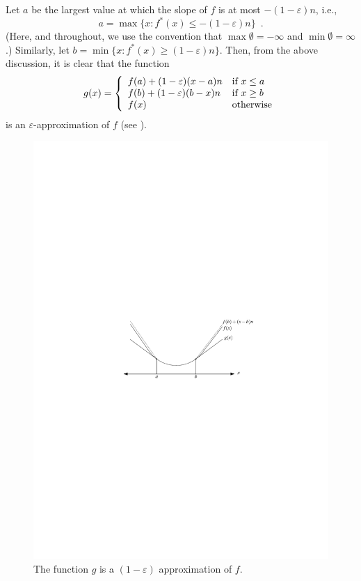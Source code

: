 \documentclass[charterfonts,lotsofwhite]{patmorin}
\newcommand{\eps}{\varepsilon}
\begin{document}
Let $a$ be the largest value at which the slope of $f$ is at most
$-(1-\eps)n$, i.e., 
\[
a=\max\{x:f^*(x)\le -(1-\eps)n \} \enspace .
\]
(Here, and throughout, we use the convention that
$\max\emptyset=-\infty$ and $\min\emptyset=\infty$.)  Similarly, let
$b=\min\{x:f^*(x)\ge (1-\eps) n\}$.  Then, from the above discussion,
it is clear that the function
\begin{equation}
 g(x) = \left\{\begin{array}{ll}
                 f(a) + (1-\eps)(x-a)n & \mbox{if $x\le a$} \\
                 f(b) + (1-\eps)(b-x)n & \mbox{if $x\ge b$} \\
                 f(x)   & \mbox{otherwise} \eqlabel{approx}
 \end{array}\right.
\end{equation}
is an $\eps$-approximation of $f$ (see ).

\begin{figure}
\begin{center}\includegraphics{approx}\end{center}
\caption{The function $g$ is a $(1-\eps)$ approximation of
$f$.}
\end{figure}
\end{document}

